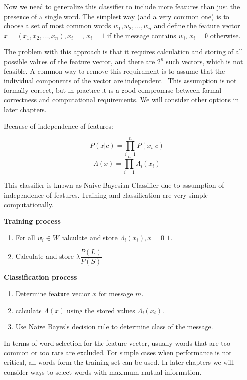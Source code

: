 \documentclass[12pt]{report}
\begin{document}
Now we need to generalize this classifier to include more features than just the presence of a single word. The simplest way (and a very common one) is to choose a set of most common words $w_1, w_2, \dots, w_n$ and define the feature vector $x = (x_1, x_2, \dots, x_n), x_i = $, $x_i = 1$ if the message contains $w_i$, $x_i = 0$ otherwise.

The problem with this approach is that it requires calculation and storing of all possible values of the feature vector, and there are $2^n$ such vectors, which is not feasible. A common way to remove this requirement is to assume that the individual components of the vector are independent \cite{Tretyakov}. This assumption is not formally correct, but in practice it is a good compromise between formal correctness and computational requirements. We will consider other options in later chapters.

Because of independence of features:

$$P(x | c) = \prod_{i=1}^{n}P(x_i | c)$$
$$\Lambda(x) = \prod_{i=1}^{n}\Lambda_i(x_i)$$

This classifier is known as Naive Bayesian Classifier due to assumption of independence of features. Training and classification are very simple computationally.

\textbf{Training process}

\begin{enumerate}
	\item For all $w_i \in W$ calculate and store $\Lambda_i(x_i), x = 0, 1$.
	\item Calculate and store $\lambda \dfrac{P(L)}{P(S)}$.
\end{enumerate}

\textbf{Classification process}

\begin{enumerate}
	\item Determine feature vector $x$ for message $m$.
	\item calculate $\Lambda(x)$ using the stored values $\Lambda_i(x_i)$.
	\item Use Naive Bayes's decision rule to determine class of the message.
\end{enumerate}

In terms of word selection for the feature vector, usually words that are too common or too rare are excluded. For simple cases when performance is not critical, all words form the training set can be used. In later chapters we will consider ways to select words with maximum mutual information.
\end{document}
